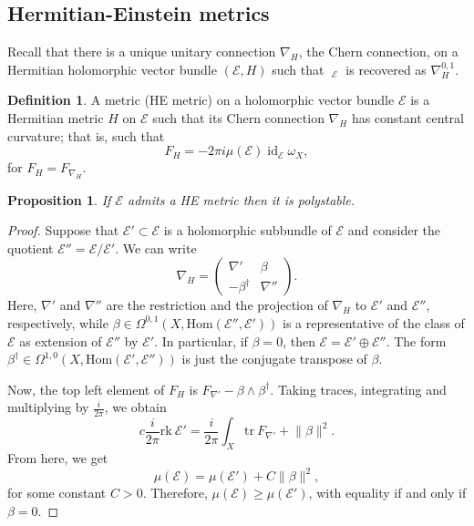 \documentclass[12pt,a4paper]{amsbook}
\newtheorem{prop}[thm]{Proposition}
\theoremstyle{remark} \newtheorem{rmk}[thm]{Remark}
\theoremstyle{definition} \newtheorem{defn}[thm]{Definition}
\theoremstyle{definition} \newtheorem{ex}[thm]{Example}
\theoremstyle{definition} \newtheorem{ej}{Exercise}
\let\emph\relax
\newcommand{\sE}{\mathscr E}
\DeclareMathOperator{\id}{id}
\DeclareMathOperator{\delbar}{\bar{\partial}}
\begin{document}
\subsection*{Hermitian-Einstein metrics}
Recall that there is a unique unitary connection $\nabla_H$, the Chern connection, on a Hermitian holomorphic vector bundle $(\sE,H)$ such that $\delbar_{\sE}$ is recovered as $\nabla_H^{0,1}$.
\begin{defn}
A \emph{Hermitian--Einstein} metric (HE metric) on a holomorphic vector bundle $\sE$ is a Hermitian metric  $H$ on $\sE$ such that its Chern connection $\nabla_H$ has constant central curvature; that is, such that
\begin{equation*}
F_H = -2\pi i \mu(\sE) \id_{\sE} \omega_X,
\end{equation*} 
for $F_H=F_{\nabla_H}$.
\end{defn}

\begin{prop} \label{prop:HEimpliesPS}
If $\sE$ admits a HE metric then it is polystable.
\end{prop}

\begin{proof}
Suppose that $\sE'\subset \sE$ is a holomorphic subbundle of $\sE$ and consider the quotient $\sE''=\sE/\sE'$. We can write
 \begin{equation*}
\nabla_H = 
\begin{pmatrix}
	\nabla' & \beta \\
	-\beta^\dagger & \nabla''
\end{pmatrix}.
\end{equation*} 
Here, $\nabla'$ and $\nabla''$ are the restriction and the projection of $\nabla_H$ to $\sE'$ and  $\sE''$, respectively, while $\beta\in \Omega^{0,1}(X,\mathrm{Hom}(\sE'',\sE'))$ is a representative of the class of $\sE$ as extension of $\sE''$ by $\sE'$. In particular, if $\beta=0$, then  $\sE=\sE'\oplus \sE''$. The form $\beta^\dagger \in \Omega^{1,0}(X,\mathrm{Hom}(\sE',\sE''))$ is just the conjugate transpose of $\beta$.

Now, the top left element of  $F_H$ is  $F_{\nabla'}-\beta \wedge \beta^\dagger$. Taking traces, integrating and multiplying by $\tfrac{i}{2\pi}$, we obtain
\begin{equation*}
c\frac{i}{2\pi} \mathrm{rk}\ \sE'  = \frac{i}{2\pi} \int_X \mathrm{tr}\ F_{\nabla'} + \lVert \beta \rVert^2.
\end{equation*} 
From here, we get
\begin{equation*}
\mu(\sE) = \mu(\sE') + C\lVert \beta \rVert^2,
\end{equation*} 
for some constant $C>0$. Therefore,  $\mu(\sE)\geq \mu(\sE')$, with equality if and only if $\beta=0$.
\end{proof}
\end{document}
